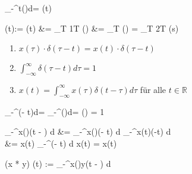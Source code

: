 \begin{abox}
	\int_{-\infty}^{t}\delta(\tau)d\tau = \epsilon(t)
\end{abox}

\begin{abox}
	\delta(t):= \epsilon(t) &= \lim\limits_{T } \frac1T ()
	&= \lim\limits_{T }  () = 
	\lim\limits_{T } \frac2T (s\pi{})
\end{abox}

\begin{tbox}
	\begin{enumerate}[label=\Roman*)]
		\item $x(\tau) \cdot \delta(\tau - t) = x(t) \cdot \delta(\tau - t)$
		\item $\int_{-\infty}^{\infty}\delta(\tau - t)d\tau = 1$
		\item $x(t) = \int_{-\infty}^{\infty}x(\tau)\delta(t-\tau)d\tau$ für alle $ t \in \mathbb{R}$
	\end{enumerate}
\end{tbox}

\begin{abox}
	\int_{-\infty}^{\infty}\delta(\tau - t)d\tau = \int_{-\infty}^{\infty}\delta(\lambda)d\lambda = \epsilon(\infty) = 1
\end{abox}


\begin{abox}
	\int_{-\infty}^{\infty}x(\tau)\delta(t  - \tau) d \tau &= 	\int_{-\infty}^{\infty}x(\tau)\delta(\tau - t) d \tau {}	\int_{-\infty}^{\infty}x(t)\delta(\tau -t) d \tau \\
	&= x(t)	\int_{-\infty}^{\infty}\delta(\tau - t) d \tau {} x(t)  = x(t)
\end{abox}

\begin{abox}
	(x * y) (t) := 	\int_{-\infty}^{\infty}x(\tau)y(t  - \tau) d \tau
\end{abox}

